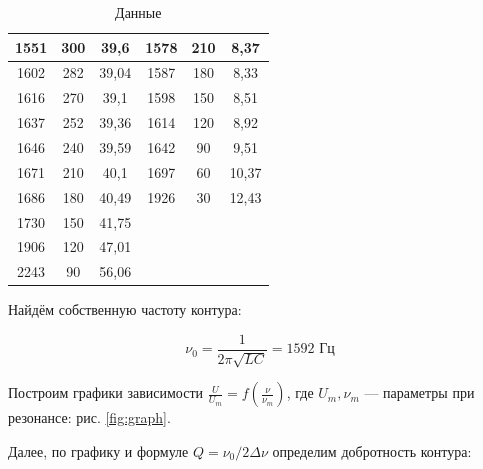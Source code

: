 \documentclass[a4paper, 12pt]{article}
\begin{document}
\begin{table}[h]
\begin{tabular}{|ccc|ccc|}
	\multicolumn{1}{|c|}{1551}   & \multicolumn{1}{c|}{300}   & 39,6  & \multicolumn{1}{c|}{1578}   & \multicolumn{1}{c|}{210}   & 8,37  \\ \hline
	\multicolumn{1}{|c|}{1602}   & \multicolumn{1}{c|}{282}   & 39,04 & \multicolumn{1}{c|}{1587}   & \multicolumn{1}{c|}{180}   & 8,33  \\ \hline
	\multicolumn{1}{|c|}{1616}   & \multicolumn{1}{c|}{270}   & 39,1  & \multicolumn{1}{c|}{1598}   & \multicolumn{1}{c|}{150}   & 8,51  \\ \hline
	\multicolumn{1}{|c|}{1637}   & \multicolumn{1}{c|}{252}   & 39,36 & \multicolumn{1}{c|}{1614}   & \multicolumn{1}{c|}{120}   & 8,92  \\ \hline
	\multicolumn{1}{|c|}{1646}   & \multicolumn{1}{c|}{240}   & 39,59 & \multicolumn{1}{c|}{1642}   & \multicolumn{1}{c|}{90}    & 9,51  \\ \hline
	\multicolumn{1}{|c|}{1671}   & \multicolumn{1}{c|}{210}   & 40,1  & \multicolumn{1}{c|}{1697}   & \multicolumn{1}{c|}{60}    & 10,37 \\ \hline
	\multicolumn{1}{|c|}{1686}   & \multicolumn{1}{c|}{180}   & 40,49 & \multicolumn{1}{c|}{1926}   & \multicolumn{1}{c|}{30}    & 12,43 \\ \hline
	\multicolumn{1}{|c|}{1730}   & \multicolumn{1}{c|}{150}   & 41,75 & \multicolumn{1}{c|}{}       & \multicolumn{1}{c|}{}      &       \\ \hline
	\multicolumn{1}{|c|}{1906}   & \multicolumn{1}{c|}{120}   & 47,01 & \multicolumn{1}{c|}{}       & \multicolumn{1}{c|}{}      &       \\ \hline
	\multicolumn{1}{|c|}{2243}   & \multicolumn{1}{c|}{90}    & 56,06 & \multicolumn{1}{c|}{}       & \multicolumn{1}{c|}{}      &       \\ \hline
	\end{tabular}
	\caption{Данные}
	\label{tab:data}
\end{table}

Найдём собственную частоту контура:

\begin{equation}
	\nu_0 = \frac{1}{2 \pi \sqrt{L C}} = 1592 \text{ Гц}
\end{equation}

Построим графики зависимости $\frac{U}{U_m} = f(\frac{\nu}{\nu_m})$, где $U_m, \nu_m$ --- параметры при резонансе: 
рис. \ref{fig:graph}.

Далее, по графику и формуле $Q = \nu_0 / 2\Delta\nu$ определим добротность контура:
\end{document}
